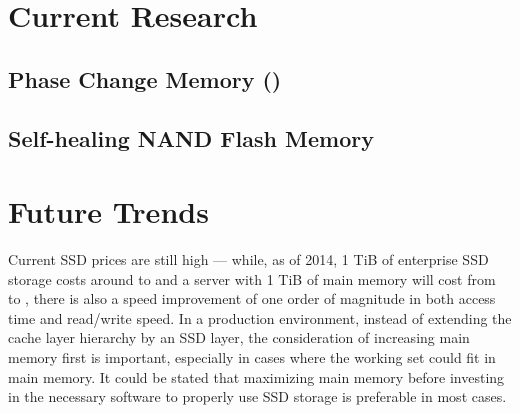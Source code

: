 \documentclass{acm_proc_article-sp}
\begin{document}
\cite{kang2012flash}

\section{Current Research}

\subsection{Phase Change Memory ()}

\subsection{Self-healing NAND Flash Memory}
\cite{wu2011exploiting}
\cite{chen2013dheating}

\section{Future Trends}
Current SSD prices are still high --- while, as of 2014, 1 TiB of enterprise SSD storage costs around  to  and a server with 1 TiB of main memory will cost from  to , there is also a speed improvement of one order of magnitude in both access time and read/write speed. In a production environment, instead of extending the cache layer hierarchy by an SSD layer, the consideration of increasing main memory first is important, especially in cases where the working set could fit in main memory. It could be stated that maximizing main memory before investing in the necessary software to properly use SSD storage is preferable in most cases.

%

%
%

\balancecolumns
\end{document}
